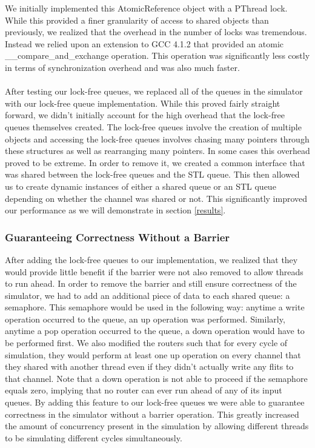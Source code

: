 \documentclass[twocolumn]{article}
\begin{document}
We initially implemented this AtomicReference object with a PThread
lock.  While this provided a finer granularity of access to shared
objects than previously, we realized that the overhead in the number of
locks was tremendous.  Instead we relied upon an extension to GCC 4.1.2
that provided an atomic \_\_compare\_and\_exchange operation.
This operation was significantly less costly in terms of synchronization
overhead and was also much faster.\\
~\\
After testing our lock-free queues, we replaced all of
the queues in the simulator with our lock-free queue implementation.  While this
proved fairly straight forward, we didn't initially account for the high
overhead that the lock-free queues themselves created.  The lock-free
queues involve the creation of multiple objects and accessing the
lock-free queues involves chasing many pointers through these structures
as well as rearranging many pointers.  In some cases this overhead proved
to be extreme.  In order to remove it, we created a common interface that
was shared between the lock-free queues and the STL queue.  This then
allowed us to create dynamic instances of either a shared queue or an STL
queue depending on whether the channel was shared or not.  This significantly
improved our performance as we will demonstrate in section \ref{results}.

\subsubsection{Guaranteeing Correctness Without a Barrier}
After adding the lock-free queues to our implementation, we realized that
they would provide little benefit if the barrier were not also removed to
allow threads to run ahead.  In order to remove the barrier and still ensure correctness of the simulator, we had to add
an additional piece of data to each shared queue: a semaphore.  This
semaphore would be used in the following way: anytime a write operation
occurred to the queue, an up operation was performed.  Similarly, anytime
a pop operation occurred to the queue, a down operation would have to be
performed first.  We also modified the routers such that for every cycle
of simulation, they would perform at least one up operation on every
channel that they shared with another thread even if they didn't actually
write any flits to that channel.  Note that a down operation is not able
to proceed if the semaphore equals zero, implying that no router can ever
run ahead of any of its input queues.  By adding this feature to our
lock-free queues we were able to guarantee correctness in the simulator
without a barrier operation.  This greatly increased the amount of
concurrency present in the simulation by allowing different threads to be
simulating different cycles simultaneously.
\end{document}
